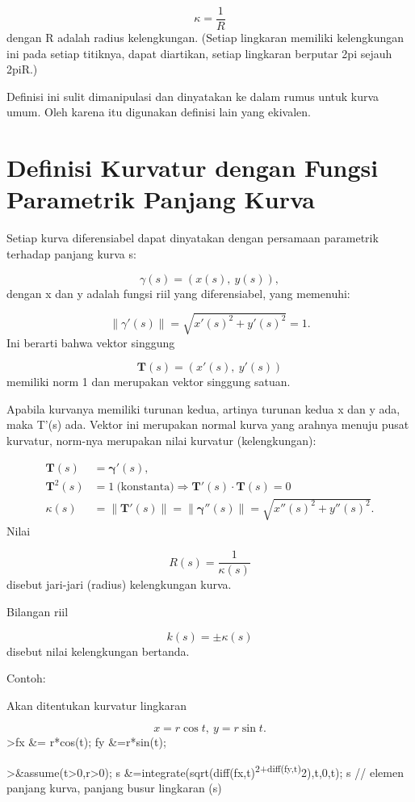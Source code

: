 \documentclass[
]{book}
\begin{document}
\[\kappa =\frac {1}{R}\]dengan R adalah radius kelengkungan. (Setiap lingkaran memiliki kelengkungan ini pada setiap titiknya, dapat diartikan, setiap lingkaran berputar 2pi sejauh 2piR.)

Definisi ini sulit dimanipulasi dan dinyatakan ke dalam rumus untuk kurva umum. Oleh karena itu digunakan definisi lain yang ekivalen.

\section{Definisi Kurvatur dengan Fungsi Parametrik Panjang Kurva}\label{definisi-kurvatur-dengan-fungsi-parametrik-panjang-kurva}

Setiap kurva diferensiabel dapat dinyatakan dengan persamaan parametrik terhadap panjang kurva s:

\[\gamma(s) = (x(s),\ y(s)),\]dengan x dan y adalah fungsi riil yang diferensiabel, yang memenuhi:

\[\|\gamma'(s)\|=\sqrt{x'(s)^2+y'(s)^2}=1.\]Ini berarti bahwa vektor singgung

\[\mathbf{T}(s)=(x'(s),\ y'(s))\]memiliki norm 1 dan merupakan vektor singgung satuan.

Apabila kurvanya memiliki turunan kedua, artinya turunan kedua x dan y ada, maka T'(s) ada. Vektor ini merupakan normal kurva yang arahnya menuju pusat kurvatur, norm-nya merupakan nilai kurvatur (kelengkungan):

\[ \begin{aligned}\mathbf{T}(s) &= \mathbf{\gamma}'(s),\\ \mathbf{T}^{2}(s) &=1\ \text{(konstanta)}\Rightarrow \mathbf{T}'(s)\cdot \mathbf{T}(s)=0\\ \kappa(s) &=\|\mathbf {T}'(s)\|= \|\mathbf{\gamma}''(s)\|=\sqrt{x''(s)^{2}+y''(s)^{2}}.\end{aligned}\]Nilai

\[R(s)=\frac{1}{\kappa(s)}\]disebut jari-jari (radius) kelengkungan kurva.

Bilangan riil

\[k(s) =\pm\kappa(s)\] disebut nilai kelengkungan bertanda.

Contoh:

Akan ditentukan kurvatur lingkaran

\[x=r\cos t,\ y= r\sin t.\]\textgreater fx \&= r*cos(t); fy \&=r*sin(t);

\textgreater\&assume(t\textgreater0,r\textgreater0); s \&=integrate(sqrt(diff(fx,t)\textsuperscript{2+diff(fy,t)}2),t,0,t); s // elemen panjang kurva, panjang busur lingkaran (s)
\end{document}
